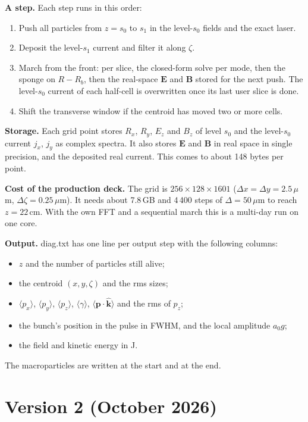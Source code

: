 \documentclass[11pt,a4paper]{article}
\newcommand{\code}[1]{{\fontencoding{OT1}\fontfamily{cmtt}\selectfont #1}}
\newcommand{\khat}{\hat{\bm k}}
\begin{document}
\textbf{A step.} Each step runs in this order:
\begin{enumerate}
\item Push all particles from $z=s_0$ to $s_1$ in the level-$s_0$ fields and the exact laser.
\item Deposit the level-$s_1$ current and filter it along $\zeta$.
\item March from the front: per slice, the closed-form solve per mode, then the sponge on $R-R_b$, then the real-space $\bm E$ and $\bm B$ stored for the next push. The level-$s_0$ current of each half-cell is overwritten once its last user slice is done.
\item Shift the transverse window if the centroid has moved two or more cells.
\end{enumerate}

\textbf{Storage.} Each grid point stores $R_x$, $R_y$, $E_z$ and $B_z$ of level $s_0$ and the level-$s_0$ current $j_x$, $j_y$ as complex spectra. It also stores $\bm E$ and $\bm B$ in real space in single precision, and the deposited real current. This comes to about 148 bytes per point.

\textbf{Cost of the production deck.} The grid is $256\times128\times1601$ ($\Delta x=\Delta y=2.5\,\mu$m, $\Delta\zeta=0.25\,\mu$m). It needs about 7.8\,GB and 4\,400 steps of $\Delta=50\,\mu$m to reach $z=22$\,cm. With the own FFT and a sequential march this is a multi-day run on one core.

\textbf{Output.} \code{diag.txt} has one line per output step with the following columns:
\begin{itemize}
\item $z$ and the number of particles still alive;
\item the centroid $(x,y,\zeta)$ and the rms sizes;
\item $\langle p_x\rangle$, $\langle p_y\rangle$, $\langle p_z\rangle$, $\langle\gamma\rangle$, $\langle\bm p\cdot\khat\rangle$ and the rms of $p_z$;
\item the bunch's position in the pulse in FWHM, and the local amplitude $a_0 g$;
\item the field and kinetic energy in J.
\end{itemize}
The macroparticles are written at the start and at the end.

\clearpage
\section{Version 2 (October 2026)}\label{sec:v2}
\end{document}
